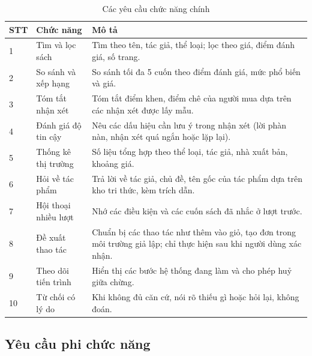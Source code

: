 \begin{table}[!htbp]
\caption{Các yêu cầu chức năng chính}
\label{tab:yc-chuc-nang}
\cobang
\begin{tabularx}{\linewidth}{C{1.1cm}P{4.2cm}Y}
\toprule
\textbf{STT} & \textbf{Chức năng} & \textbf{Mô tả}\\
 & Tìm và lọc sách & Tìm theo tên, tác giả, thể loại; lọc theo giá, điểm đánh giá, số trang.\\
2 & So sánh và xếp hạng & So sánh tối đa 5 cuốn theo điểm đánh giá, mức phổ biến và giá.\\
3 & Tóm tắt nhận xét & Tóm tắt điểm khen, điểm chê của người mua dựa trên các nhận xét được lấy mẫu.\\
4 & Đánh giá độ tin cậy & Nêu các dấu hiệu cần lưu ý trong nhận xét (lời phàn nàn, nhận xét quá ngắn hoặc lặp lại).\\
5 & Thống kê thị trường & Số liệu tổng hợp theo thể loại, tác giả, nhà xuất bản, khoảng giá.\\
6 & Hỏi về tác phẩm & Trả lời về tác giả, chủ đề, tên gốc của tác phẩm dựa trên kho tri thức, kèm trích dẫn.\\
7 & Hội thoại nhiều lượt & Nhớ các điều kiện và các cuốn sách đã nhắc ở lượt trước.\\
8 & Đề xuất thao tác & Chuẩn bị các thao tác như thêm vào giỏ, tạo đơn trong môi trường giả lập; chỉ thực hiện sau khi người dùng xác nhận.\\
9 & Theo dõi tiến trình & Hiển thị các bước hệ thống đang làm và cho phép huỷ giữa chừng.\\
10 & Từ chối có lý do & Khi không đủ căn cứ, nói rõ thiếu gì hoặc hỏi lại, không đoán.\\
\bottomrule
\end{tabularx}
\end{table}

\subsection{Yêu cầu phi chức năng}

